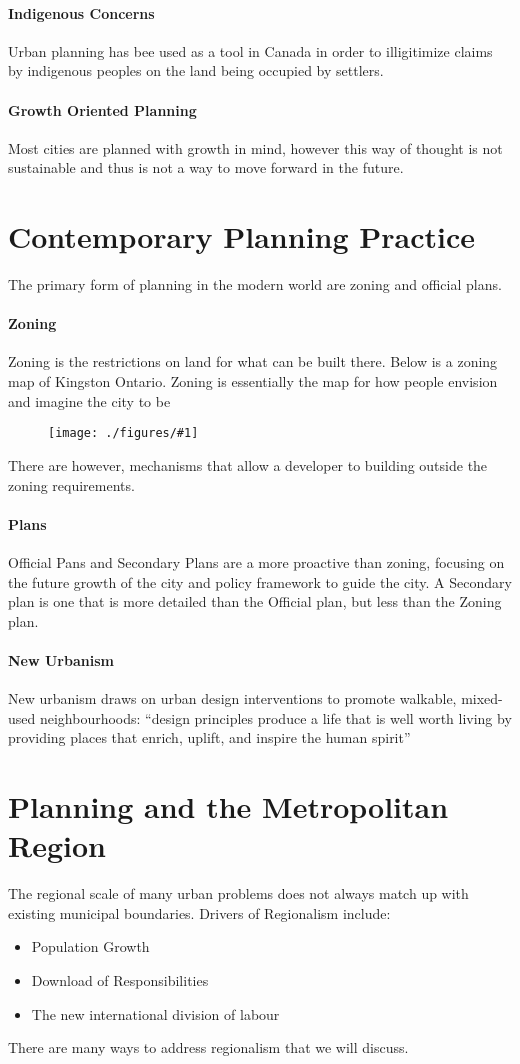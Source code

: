 \documentclass[12pt]{book}
\newcommand{\incimg}[2]{%
       \begin{figure}[h]
               \centering
               \texttt{[image: ./figures/\#1]}
       \end{figure}
}
\begin{document}
\paragraph{Indigenous Concerns}
Urban planning has bee used as a tool in Canada in order to illigitimize claims by 
indigenous peoples on the land being occupied by settlers.

\paragraph{Growth Oriented Planning}
Most cities are planned with growth in mind, however this way of thought is not 
sustainable and thus is not a way to move forward in the future.

\section*{Contemporary Planning Practice}
The primary form of planning in the modern world are zoning and official plans.

\paragraph{Zoning}
Zoning is the restrictions on land for what can be built there. Below is a zoning map 
of Kingston Ontario. Zoning is essentially the map for how people envision and imagine
the city to be
\incimg{zoning}{0.5}

There are however, mechanisms that allow a developer to building outside the zoning
requirements. 

\paragraph{Plans}
Official Pans and Secondary Plans are a more proactive than zoning, focusing on the
future growth of the city and policy framework to guide the city. A Secondary plan is 
one that is more detailed than the Official plan, but less than the Zoning plan. 

\paragraph{New Urbanism}
New urbanism draws on urban design interventions to promote walkable,
mixed-used neighbourhoods: “design principles produce a life that is well
worth living by providing places that enrich, uplift, and inspire the human spirit” 

\section*{Planning and the Metropolitan Region}
The regional scale of many urban problems does not always match up with existing
municipal boundaries. Drivers of Regionalism include:
\begin{itemize}
        \item Population Growth
        \item Download of Responsibilities
        \item The new international division of labour
\end{itemize}
There are many ways to address regionalism that we will discuss.
\end{document}
